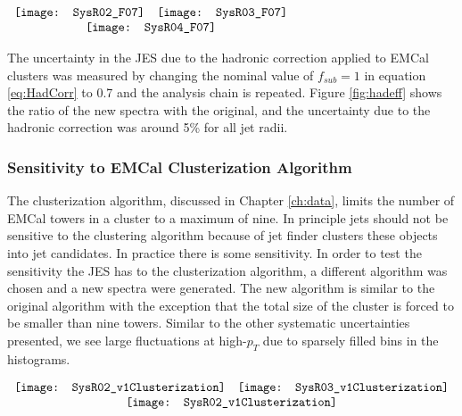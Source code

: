 \begin{figure*}[t!]
$\begin{array}{rl}
    \texttt{[image: SysR02\_F07]} &
    \texttt{[image: SysR03\_F07]}\\
    \multicolumn{2}{c}{\texttt{[image: SysR04\_F07]}}
\end{array}$
\caption[Systematic due to Hadronic correction.]{\label{fig:hadeff}Systematic uncertainty due to hadronic correction efficiency; R = 0.2 \textit{(top left)}, R = 0.3 \textit{(top right)}, R = 0.4 \textit{(bottom)}.}
\end{figure*}

The uncertainty in the JES due to the hadronic correction applied to EMCal clusters was measured by changing the nominal value of $f_{sub} = 1$ in equation \ref{eq:HadCorr} to 0.7 and the analysis chain is repeated.  Figure \ref{fig:hadeff} shows the ratio of the new spectra with the original, and the uncertainty due to the hadronic correction was around 5\% for all jet radii.

\subsubsection{Sensitivity to EMCal Clusterization Algorithm}
The clusterization algorithm, discussed in Chapter \ref{ch:data}, limits the number of EMCal towers in a cluster to a maximum of nine.  In principle jets should not be sensitive to the clustering algorithm because of jet finder clusters these objects into jet candidates. In practice there is some sensitivity.  In order to test the sensitivity the JES has to the clusterization algorithm, a different algorithm was chosen and a new spectra were generated.  The new algorithm is similar to the original algorithm with the exception that the total size of the cluster is forced to be smaller than nine towers.  Similar to the other systematic uncertainties presented, we see large fluctuations at high-$p_{T}$ due to sparsely filled bins in the histograms.  

\begin{figure*}[t!]
$\begin{array}{rl}
    \texttt{[image: SysR02\_v1Clusterization]} &
    \texttt{[image: SysR03\_v1Clusterization]}\\
    \multicolumn{2}{c}{\texttt{[image: SysR02\_v1Clusterization]}}
\end{array}$
\caption[Systematic due to clusterization algorithm.]{\label{fig:cluseff}Systematic uncertainty due to EMCal clusterization algorithm; R = 0.2 \textit{(top left)}, R = 0.3 \textit{(top right)}, R = 0.4 \textit{(bottom)}.}
\end{figure*}

